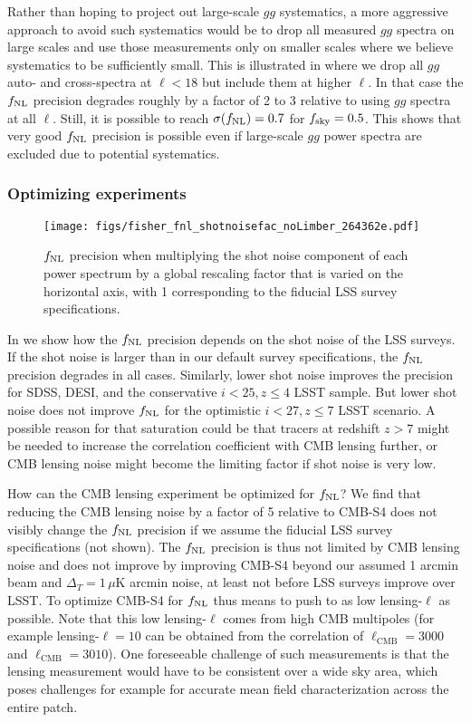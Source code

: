 \documentclass[prd,superscriptaddress,floatfix,notitlepage,nofootinbib,reprint]{revtex4-1} %
\begin{document}
Rather than hoping to project out large-scale $gg$ systematics, a more aggressive approach to avoid such systematics would be to drop all measured $gg$ spectra on large scales and use those measurements only on smaller scales where we believe systematics to be sufficiently small.
This is illustrated in  where we drop all $gg$ auto- and cross-spectra at $\ell<18$ but include them at higher $\ell$.
In that case the ${f_\mathrm{NL}}$ precision degrades roughly by a factor of 2 to 3 relative to using $gg$ spectra at all $\ell$.
Still, it is possible to reach $\sigma({f_\mathrm{NL}})= 0.7$ for ${f_\mathrm{sky}}=0.5$. 
This shows that very good ${f_\mathrm{NL}}$ precision is possible even if large-scale $gg$ power spectra are excluded due to potential systematics.


\subsubsection{Optimizing experiments}


\begin{figure}[tbp]
\texttt{[image: figs/fisher\_fnl\_shotnoisefac\_noLimber\_264362e.pdf]}
\caption{${f_\mathrm{NL}}$ precision when multiplying the shot noise component of each power spectrum by a global rescaling factor that is varied on the horizontal axis, with 1 corresponding to the fiducial LSS survey specifications.
}
\label{fig:fnl_shotnoise}
\end{figure}

In  we show how the ${f_\mathrm{NL}}$ precision depends on the shot noise of the LSS surveys. If the shot noise is larger than in our default survey specifications, the ${f_\mathrm{NL}}$ precision degrades in all cases.
Similarly, lower shot noise improves the precision for SDSS, DESI, and the conservative $i<25,z\le 4$ LSST sample.
But lower shot noise does not improve ${f_\mathrm{NL}}$ for the optimistic $i<27,z\le 7$ LSST scenario. 
A possible reason for that saturation could be that tracers at redshift $z>7$ might be needed to increase the correlation coefficient with CMB lensing further, or CMB lensing noise might become the limiting factor if shot noise is very low.




How can the CMB lensing experiment be optimized for ${f_\mathrm{NL}}$?
We find that reducing the CMB lensing noise by a factor of 5 relative to CMB-S4 does not visibly change the ${f_\mathrm{NL}}$ precision if we assume the fiducial LSS survey specifications (not shown).
The ${f_\mathrm{NL}}$ precision is thus not limited by CMB lensing noise and does not improve by improving CMB-S4 beyond our assumed 1 arcmin beam and $\Delta_{T}=1\,\mu$K arcmin noise, at least not before LSS surveys improve over LSST.
To optimize CMB-S4 for ${f_\mathrm{NL}}$ thus means to push to as low lensing-$\ell$ as possible.
Note that this low lensing-$\ell$ comes from high CMB multipoles (for example lensing-$\ell=10$ can be obtained from the correlation of $\ell_\mathrm{CMB}=3000$ and $\ell_\mathrm{CMB}=3010$).
One foreseeable challenge of such measurements is that the lensing measurement would have to be consistent over a wide sky area, which poses challenges for example for accurate mean field characterization across the entire patch.
\end{document}
